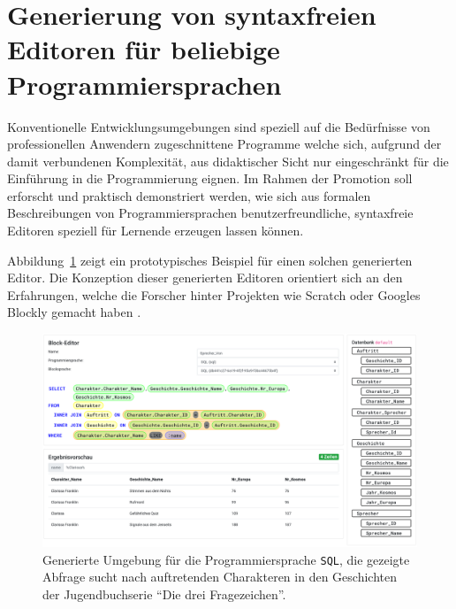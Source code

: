 \documentclass[paper=a4,fontsize=12pt,parskip=half]{scrartcl}
\begin{document}
\section*{Generierung von syntaxfreien Editoren für beliebige Programmiersprachen}

Konventionelle Entwicklungsumgebungen sind speziell auf die Bedürfnisse von professionellen Anwendern zugeschnittene Programme welche sich, aufgrund der damit verbundenen Komplexität, aus didaktischer Sicht nur eingeschränkt für die Einführung in die Programmierung eignen. Im Rahmen der Promotion soll erforscht und praktisch demonstriert werden, wie sich aus formalen Beschreibungen von Programmiersprachen benutzerfreundliche, syntaxfreie Editoren speziell für Lernende erzeugen lassen können.

Abbildung~\ref{fig:example-sql-ide} zeigt ein prototypisches Beispiel für einen solchen generierten Editor. Die Konzeption dieser generierten Editoren orientiert sich an den Erfahrungen, welche die Forscher hinter Projekten wie Scratch \cite{resnick_scratch:_2009} oder Googles Blockly gemacht haben \cite{fraser_ten_2015}.

\begin{figure}[p]
  \includegraphics[width=\linewidth]{screenshot-drag-drop-ide.png}
  \caption{Generierte Umgebung für die Programmiersprache \texttt{SQL}, die gezeigte Abfrage sucht nach auftretenden Charakteren in den Geschichten der Jugendbuchserie \enquote{Die drei Fragezeichen}.}
  \label{fig:example-sql-ide}
\end{figure}


\end{document}
